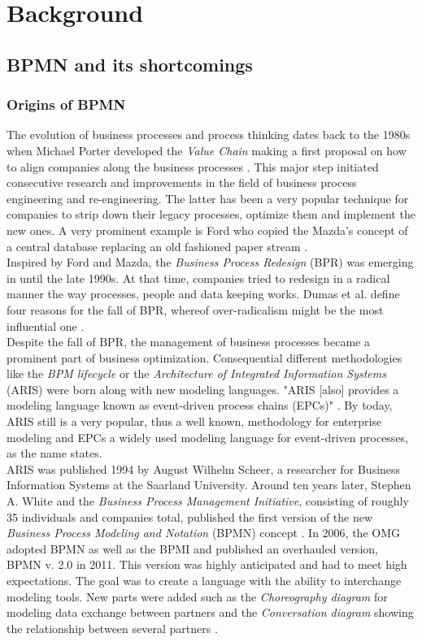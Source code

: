 \chapter{Background}
\label{chapter:background}

\section{BPMN and its shortcomings}
\subsection{Origins of BPMN}
The evolution of business processes and process thinking dates back to the 1980s when Michael Porter developed the \textit{Value Chain} making a first proposal on how to align companies along the business processes \cite{Porter1988}. 
This major step initiated consecutive research and improvements in the field of business process engineering and re-engineering. The latter has been a very popular technique for companies to strip down their legacy processes, optimize them and implement the new ones. A very prominent example is Ford who copied the Mazda's concept of a central database replacing an old fashioned paper stream \cite{Dumas2013}. \\
Inspired by Ford and Mazda, the \textit{Business Process Redesign} (BPR) was emerging in until the late 1990s. At that time, companies tried to redesign in a radical manner the way processes, people and data keeping works. Dumas et al. define four reasons for the fall of BPR, whereof over-radicalism might be the most influential one \cite{Dumas2013}. \\

Despite the fall of BPR, the management of business processes became a prominent part of business optimization. Consequential different methodologies like the \textit{BPM lifecycle} or the \textit{Architecture of Integrated Information Systems} (ARIS) were born along with new modeling languages. "ARIS [also] provides a modeling language known as event-driven process chains (EPCs)" \cite{Lankhorst2009}. By today, ARIS still is a very popular, thus a well known, methodology for enterprise modeling and EPCs a widely used modeling language for event-driven processes, as the name states. \\
ARIS was published 1994 by August Wilhelm Scheer, a researcher for Business Information Systems at the Saarland University. Around ten years later, Stephen A. White and the \textit{Business Process Management Initiative}, consisting of roughly 35 individuals and companies total, published the first version of the new \textit{Business Process Modeling and Notation} (BPMN) concept \cite{Allweyer2010}. In 2006, the OMG adopted BPMN as well as the BPMI and published an overhauled version, BPMN v. 2.0 in 2011. This version was highly anticipated and had to meet high expectations. The goal was to create a language with the ability to interchange modeling tools. New parts were added such as the \textit{Choreography diagram} for modeling data exchange between partners and the \textit{Conversation diagram} showing the relationship between several partners \cite{Allweyer2010}. 


